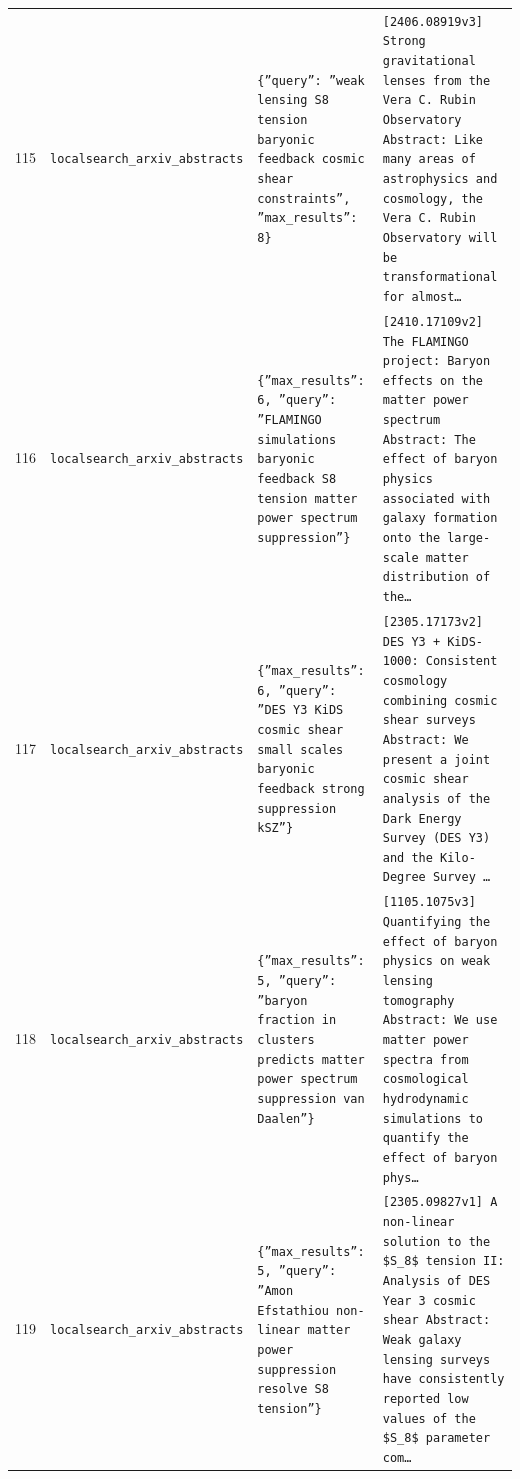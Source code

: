\documentclass[11pt,a4paper]{article}
\begin{document}
\begin{longtable}{@{}p{}p{}p{}p{}@{}}
115 & \texttt{local}\newline\texttt{search\_\allowbreak{}arxiv\_\allowbreak{}abstracts} & \texttt{\{''query'':\allowbreak{} ''weak lensing S8 tension baryonic feedback cosmic shear constraints'',\allowbreak{} ''max\_\allowbreak{}results'':\allowbreak{} 8\}\allowbreak{}} & \texttt{[2406.08919v3]\allowbreak{} Strong gravitational lenses from the Vera C. Rubin Observatory Abstract:\allowbreak{} Like many areas of astrophysics and cosmology,\allowbreak{} the Vera C. Rubin Observatory will be transformational for almost\ldots{}\allowbreak{}} \\
116 & \texttt{local}\newline\texttt{search\_\allowbreak{}arxiv\_\allowbreak{}abstracts} & \texttt{\{''max\_\allowbreak{}results'':\allowbreak{} 6,\allowbreak{} ''query'':\allowbreak{} ''FLAMINGO simulations baryonic feedback S8 tension matter power spectrum suppression''\}\allowbreak{}} & \texttt{[2410.17109v2]\allowbreak{} The FLAMINGO project:\allowbreak{} Baryon effects on the matter power spectrum Abstract:\allowbreak{} The effect of baryon physics associated with galaxy formation onto the large-scale matter distribution of the\ldots{}\allowbreak{}} \\
117 & \texttt{local}\newline\texttt{search\_\allowbreak{}arxiv\_\allowbreak{}abstracts} & \texttt{\{''max\_\allowbreak{}results'':\allowbreak{} 6,\allowbreak{} ''query'':\allowbreak{} ''DES Y3 KiDS cosmic shear small scales baryonic feedback strong suppression kSZ''\}\allowbreak{}} & \texttt{[2305.17173v2]\allowbreak{} DES Y3 + KiDS-1000:\allowbreak{} Consistent cosmology combining cosmic shear surveys Abstract:\allowbreak{} We present a joint cosmic shear analysis of the Dark Energy Survey (DES Y3)\allowbreak{} and the Kilo-Degree Survey \ldots{}\allowbreak{}} \\
118 & \texttt{local}\newline\texttt{search\_\allowbreak{}arxiv\_\allowbreak{}abstracts} & \texttt{\{''max\_\allowbreak{}results'':\allowbreak{} 5,\allowbreak{} ''query'':\allowbreak{} ''baryon fraction in clusters predicts matter power spectrum suppression van Daalen''\}\allowbreak{}} & \texttt{[1105.1075v3]\allowbreak{} Quantifying the effect of baryon physics on weak lensing tomography Abstract:\allowbreak{} We use matter power spectra from cosmological hydrodynamic simulations to quantify the effect of baryon phys\ldots{}\allowbreak{}} \\
119 & \texttt{local}\newline\texttt{search\_\allowbreak{}arxiv\_\allowbreak{}abstracts} & \texttt{\{''max\_\allowbreak{}results'':\allowbreak{} 5,\allowbreak{} ''query'':\allowbreak{} ''Amon Efstathiou non-linear matter power suppression resolve S8 tension''\}\allowbreak{}} & \texttt{[2305.09827v1]\allowbreak{} A non-linear solution to the \$S\_\allowbreak{}8\$ tension II:\allowbreak{} Analysis of DES Year 3 cosmic shear Abstract:\allowbreak{} Weak galaxy lensing surveys have consistently reported low values of the \$S\_\allowbreak{}8\$ parameter com\ldots{}\allowbreak{}} \\

\end{longtable}
\end{document}
